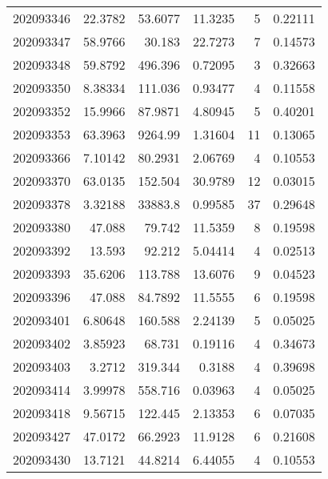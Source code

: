 \begin{tabular}{rrrrrr}
 202093346 &         22.3782  &       53.6077 &           11.3235  &           5 & 0.22111 \\
 202093347 &         58.9766  &       30.183  &           22.7273  &           7 & 0.14573 \\
 202093348 &         59.8792  &      496.396  &            0.72095 &           3 & 0.32663 \\
 202093350 &          8.38334 &      111.036  &            0.93477 &           4 & 0.11558 \\
 202093352 &         15.9966  &       87.9871 &            4.80945 &           5 & 0.40201 \\
 202093353 &         63.3963  &     9264.99   &            1.31604 &          11 & 0.13065 \\
 202093366 &          7.10142 &       80.2931 &            2.06769 &           4 & 0.10553 \\
 202093370 &         63.0135  &      152.504  &           30.9789  &          12 & 0.03015 \\
 202093378 &          3.32188 &    33883.8    &            0.99585 &          37 & 0.29648 \\
 202093380 &         47.088   &       79.742  &           11.5359  &           8 & 0.19598 \\
 202093392 &         13.593   &       92.212  &            5.04414 &           4 & 0.02513 \\
 202093393 &         35.6206  &      113.788  &           13.6076  &           9 & 0.04523 \\
 202093396 &         47.088   &       84.7892 &           11.5555  &           6 & 0.19598 \\
 202093401 &          6.80648 &      160.588  &            2.24139 &           5 & 0.05025 \\
 202093402 &          3.85923 &       68.731  &            0.19116 &           4 & 0.34673 \\
 202093403 &          3.2712  &      319.344  &            0.3188  &           4 & 0.39698 \\
 202093414 &          3.99978 &      558.716  &            0.03963 &           4 & 0.05025 \\
 202093418 &          9.56715 &      122.445  &            2.13353 &           6 & 0.07035 \\
 202093427 &         47.0172  &       66.2923 &           11.9128  &           6 & 0.21608 \\
 202093430 &         13.7121  &       44.8214 &            6.44055 &           4 & 0.10553 \\

\end{tabular}
